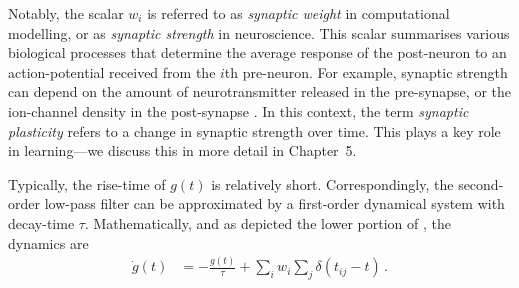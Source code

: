 Notably, the scalar $w_i$ is referred to as \emph{synaptic weight} in computational modelling, or as \emph{synaptic strength} in neuroscience.
This scalar summarises various biological processes that determine the average response of the post-neuron to an action-potential received from the $i$th pre-neuron.
For example, synaptic strength can depend on the amount of neurotransmitter released in the pre-synapse, or the ion-channel density in the post-synapse \citep[Chapter~12]{kandel2012principles}.
In this context, the term \emph{synaptic plasticity} refers to a change in synaptic strength over time.
This plays a key role in learning---we discuss this in more detail in Chapter~5.


Typically, the rise-time of $g(t)$ is relatively short.
Correspondingly, the second-order low-pass filter can be approximated by a first-order dynamical system with decay-time $\tau$.
Mathematically, and as depicted the lower portion of , the dynamics are
\begin{align}
	\dot g(t) &= -\frac{g(t)}{\tau} + \sum\nolimits_{i}  w_i \sum\nolimits_{j} \delta(t_{ij} - t) \,.
	\label{eqn:low_pass_first_order}
\end{align}

